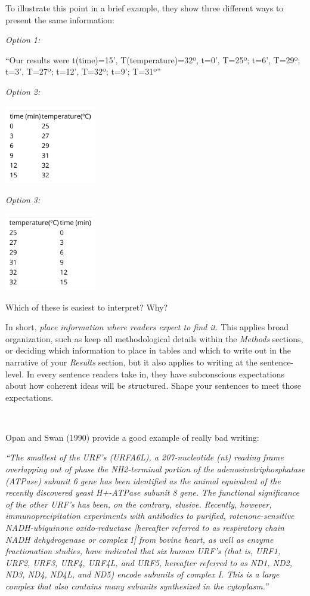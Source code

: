 \documentclass[
]{book}
\begin{document}
To illustrate this point in a brief example, they show three different ways to present the same information:

\emph{Option 1:}

``Our results were t(time)=15', T(temperature)=32º, t=0', T=25º; t=6', T=29º; t=3', T=27º; t=12', T=32º; t=9'; T=31º''

\emph{Option 2:}

\includegraphics[width=0.3\textwidth,height=\textheight]{img/style-eg1.png}

\emph{Option 3:}

\includegraphics[width=0.3\textwidth,height=\textheight]{img/style-eg2.png}

Which of these is easiest to interpret? Why?

In short, \emph{place information where readers expect to find it.} This applies broad organization, such as keep all methodological details within the \emph{Methods} sections, or deciding which information to place in tables and which to write out in the narrative of your \emph{Results} section, but it also applies to writing at the sentence-level. In every sentence readers take in, they have subconscious expectations about how coherent ideas will be structured. Shape your sentences to meet those expectations.

~

Opan and Swan (1990) provide a good example of really bad writing:

\emph{``The smallest of the URF's (URFA6L), a 207-nucleotide (nt) reading frame overlapping out of phase the NH2-terminal portion of the adenosinetriphosphatase (ATPase) subunit 6 gene has been identified as the animal equivalent of the recently discovered yeast H+-ATPase subunit 8 gene. The functional significance of the other URF's has been, on the contrary, elusive. Recently, however, immunoprecipitation experiments with antibodies to purified, rotenone-sensitive NADH-ubiquinone oxido-reductase {[}hereafter referred to as respiratory chain NADH dehydrogenase or complex I{]} from bovine heart, as well as enzyme fractionation studies, have indicated that six human URF's (that is, URF1, URF2, URF3, URF4, URF4L, and URF5, hereafter referred to as ND1, ND2, ND3, ND4, ND4L, and ND5) encode subunits of complex I. This is a large complex that also contains many subunits synthesized in the cytoplasm.''}
\end{document}
